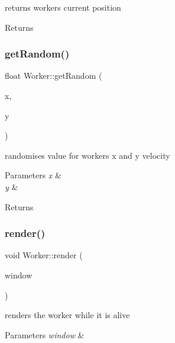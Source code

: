returns workers current position 

\begin{DoxyReturn}{Returns}

\end{DoxyReturn}
\mbox{\label{class_worker_adc26f6c33bf87fe8464924b688b35924}} 
\subsubsection{\texorpdfstring{getRandom()}{getRandom()}}
{\footnotesize\ttfamily float Worker\+::get\+Random (\begin{DoxyParamCaption}\item[{int}]{x,  }\item[{int}]{y }\end{DoxyParamCaption})}



randomises value for workers x and y velocity 


\begin{DoxyParams}{Parameters}
{\em x} & \\
\hline
{\em y} & \\
\hline
\end{DoxyParams}
\begin{DoxyReturn}{Returns}

\end{DoxyReturn}
\mbox{\label{class_worker_a18940af5e921feefc2373e120d66ff24}} 
\subsubsection{\texorpdfstring{render()}{render()}}
{\footnotesize\ttfamily void Worker\+::render (\begin{DoxyParamCaption}\item[{sf\+::\+Render\+Window \&}]{window }\end{DoxyParamCaption})}



renders the worker while it is alive 


\begin{DoxyParams}{Parameters}
{\em window} & \\
\hline
\end{DoxyParams}
\mbox{\label{class_worker_a4bc0c766d4aaddc7a564d8601ee114e4}} 
